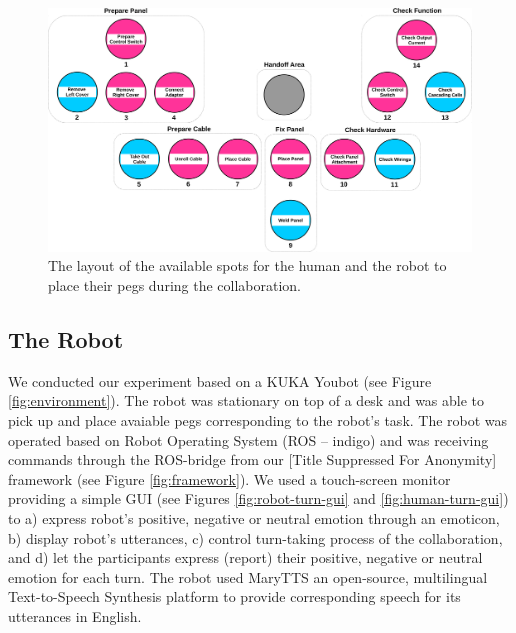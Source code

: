\documentclass[12pt]{report}
\begin{document}
\begin{figure}[tbh]
  \centering
  \includegraphics[width=1\textwidth]{figure/gameBoard.pdf}
  \caption{The layout of the available spots for the human and the robot to
  place their pegs during the collaboration.}
  \label{fig:game_board}
  \vspace*{-3mm}
\end{figure}

\subsection{The Robot}

We conducted our experiment based on a KUKA Youbot (see Figure
\ref{fig:environment}). The robot was stationary on top of a desk and was able
to pick up and place avaiable pegs corresponding to the robot's task. The robot
was operated based on Robot Operating System (ROS -- indigo) and was receiving
commands through the ROS-bridge from our [Title Suppressed For Anonymity]
framework (see Figure \ref{fig:framework}). We used a touch-screen monitor
providing a simple GUI (see Figures \ref{fig:robot-turn-gui} and
\ref{fig:human-turn-gui}) to a) express robot's positive, negative or neutral
emotion through an emoticon, b) display robot's utterances, c) control
turn-taking process of the collaboration, and d) let the participants express
(report) their positive, negative or neutral emotion for each turn. The robot
used MaryTTS an open-source, multilingual Text-to-Speech Synthesis platform to
provide corresponding speech for its utterances in English.
\end{document}
